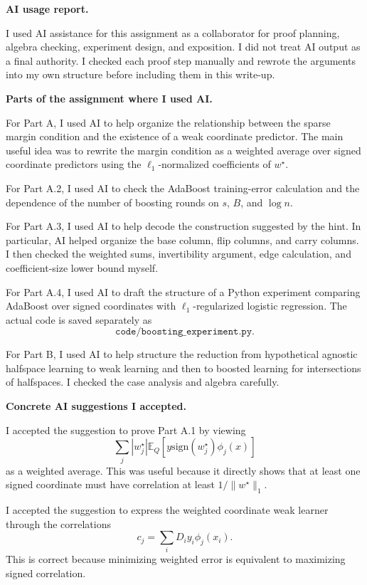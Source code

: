 \documentclass[11pt]{article}
\newcommand{\E}{\mathbb{E}}
\newcommand{\sign}{\mathrm{sign}}
\begin{document}
\begin{solutionbox}
\textbf{AI usage report.}

I used AI assistance for this assignment as a collaborator for proof planning, algebra checking,
experiment design, and exposition. I did not treat AI output as a final authority. I checked each
proof step manually and rewrote the arguments into my own structure before including them in this
write-up.

\medskip

\textbf{Parts of the assignment where I used AI.}

For Part A, I used AI to help organize the relationship between the sparse margin condition and the
existence of a weak coordinate predictor. The main useful idea was to rewrite the margin condition
as a weighted average over signed coordinate predictors using the $\ell_1$-normalized coefficients
of $w^\star$.

For Part A.2, I used AI to check the AdaBoost training-error calculation and the dependence of the
number of boosting rounds on $s$, $B$, and $\log n$.

For Part A.3, I used AI to help decode the construction suggested by the hint. In particular, AI
helped organize the base column, flip columns, and carry columns. I then checked the weighted sums,
invertibility argument, edge calculation, and coefficient-size lower bound myself.

For Part A.4, I used AI to draft the structure of a Python experiment comparing AdaBoost over signed
coordinates with $\ell_1$-regularized logistic regression. The actual code is saved separately as
\[
\texttt{code/boosting\_experiment.py}.
\]

For Part B, I used AI to help structure the reduction from hypothetical agnostic halfspace learning
to weak learning and then to boosted learning for intersections of halfspaces. I checked the
case analysis and algebra carefully.

\medskip

\textbf{Concrete AI suggestions I accepted.}

I accepted the suggestion to prove Part A.1 by viewing
\[
\sum_j |w_j^\star|
\E_Q[y\sign(w_j^\star)\phi_j(x)]
\]
as a weighted average. This was useful because it directly shows that at least one signed coordinate
must have correlation at least $1/\|w^\star\|_1$.

I accepted the suggestion to express the weighted coordinate weak learner through the correlations
\[
c_j=\sum_iD_i y_i\phi_j(x_i).
\]
This is correct because minimizing weighted error is equivalent to maximizing signed correlation.


\end{solutionbox}
\end{document}
